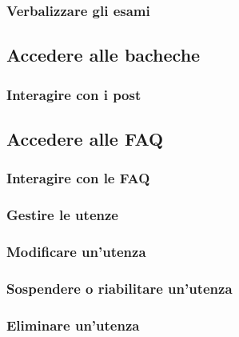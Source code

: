 \documentclass [a4paper,11pt]{book}
\begin{document}

\subsubsection{Verbalizzare gli esami}

\medskip

\subsection{Accedere alle bacheche}


\subsubsection{Interagire con i post}

\medskip

\subsection{Accedere alle FAQ}


\subsubsection{Interagire con le FAQ}

\medskip

\subsubsection{Gestire le utenze}


\subsubsection{Modificare un'utenza}

\medskip

\subsubsection{Sospendere o riabilitare un'utenza}

\medskip

\subsubsection{Eliminare un'utenza}

\medskip
\end{document}
